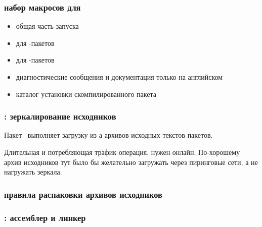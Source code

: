 {

\subsubsection{набор макросов для }

\begin{itemize}
  \item{} общая часть запуска 
  \item{} для -пакетов
  \item{} для -пакетов
\end{itemize}

\begin{itemize}
  \item{} диагностические сообщения и документация только на
английском
\item{} каталог установки скомпилированного пакета
\end{itemize}



\subsubsection{: зеркалирование исходников}

Пакет \ выполняет загрузку из \internet а архивов исходных текстов
пакетов. 

Длительная и потребляющая трафик операция, нужен онлайн. По-хорошему архив
исходников тут было бы желательно загружать через пиринговые сети, а не
нагружать зеркала.



\subsubsection{правила распаковки архивов исходников}




\subsubsection{: ассемблер и линкер}

}
